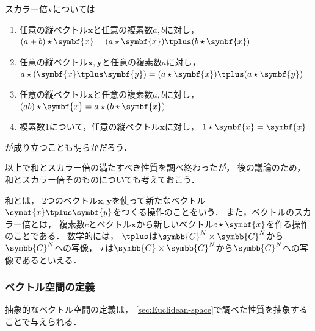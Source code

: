 \documentclass[
]{sotsu}
\newcommand{\fire}[1]{\textcolor{fire}{#1}}
\begin{document}
スカラー倍$\mathbin{\star}$については
\begin{enumerate}
    \item[\labelcref*{vector:scalar-sum}]
        \fire{任意の縦ベクトル$\symbf{x}$}と\fire{任意の複素数$a, b$}に対し，
        $(a + b) \scaprod \symbf{x} = (a \scaprod \symbf{x}) \vecplus (b \scaprod \symbf{x})$
    \item[\labelcref*{vector:scalar-distributive}]
        \fire{任意の縦ベクトル$\symbf{x}, \symbf{y}$}と\fire{任意の複素数$a$}に対し，
        $a \scaprod (\symbf{x} \vecplus \symbf{y}) = (a \scaprod \symbf{x}) \vecplus (a \scaprod \symbf{y})$
    \item[\labelcref*{vector:scalar-prod}]
        \fire{任意の縦ベクトル$\symbf{x}$}と\fire{任意の複素数$a, b$}に対し，
        $(ab) \scaprod \symbf{x} = a \scaprod (b \scaprod \symbf{x})$
    \item[\labelcref*{vector:scalar-identity}]
        複素数$1$について，\fire{任意の縦ベクトル$\symbf{x}$}に対し，
        $1 \scaprod \symbf{x} = \symbf{x}$
\end{enumerate}
が成り立つことも明らかだろう．

以上で和とスカラー倍の満たすべき性質を調べ終わったが，
後の議論のため，
和とスカラー倍そのものについても考えておこう．

和とは，
2つのベクトル$\symbf{x}, \symbf{y}$を使って新たなベクトル$\symbf{x} \vecplus \symbf{y}$をつくる操作のことをいう．
また，ベクトルのスカラー倍とは，
複素数$c$とベクトル$\symbf{x}$から新しいベクトル$c \scaprod \symbf{x}$を作る操作のことである．
数学的には，
$\vecplus$は$\symbb{C}^N \times \symbb{C}^N$から$\symbb{C}^N$への写像，
$\mathbin{\star}$は$\symbb{C} \times \symbb{C}^N$から$\symbb{C}^N$への写像であるといえる．



\subsubsection{ベクトル空間の定義}
\label{sec:definition-of-vector-space}

抽象的なベクトル空間の定義は，
\cref{sec:Euclidean-space}で調べた性質を抽象することで与えられる．
\end{document}
